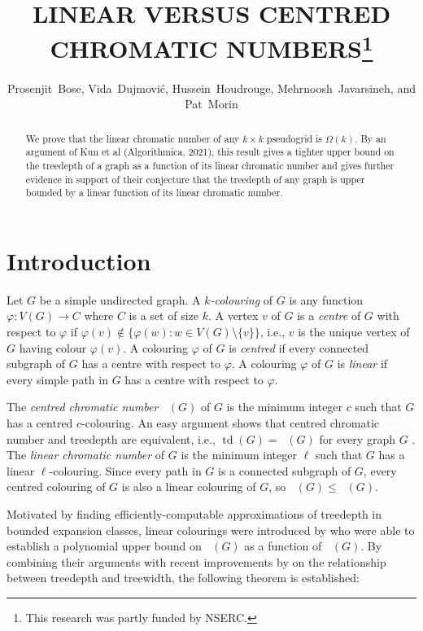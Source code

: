 \documentclass{patmorin}
\title{\MakeUppercase{Linear versus centred chromatic numbers}\thanks{This research was partly funded by NSERC.}}
\author{Prosenjit~Bose, Vida~Dujmović, Hussein~Houdrouge, Mehrnoosh~Javarsineh, and Pat~Morin}
\date{}
\newcommand{\defin}[1]{\emph{\color{brightmaroon}#1}}
\DeclareMathOperator{\td}{td}
\DeclareMathOperator{\chicen}{\chi_{\mathrm{cen}}}
\DeclareMathOperator{\chilin}{\chi_{\mathrm{lin}}}
\begin{document}
\maketitle
\renewcommand{\E}{\mathbb{E}}
\renewcommand{\Pr}{\mathbb{P}}

\begin{abstract}
  We prove that the linear chromatic number of any $k\times k$ pseudogrid is $\Omega(k)$.  By an argument of Kun et al (Algorithmica, 2021), this result gives a tighter upper bound on the treedepth of a graph as a function of its linear chromatic number and gives further evidence in support of their conjecture that the treedepth of any graph is upper bounded by a linear function of its linear chromatic number.
\end{abstract}

\section{Introduction}

Let $G$ be a simple undirected graph.  A \defin{$k$-colouring} of $G$ is any function $\varphi:V(G)\to C$ where $C$ is a set of size $k$.  A vertex $v$ of $G$ is a \defin{centre} of $G$ with respect to $\varphi$ if $\varphi(v)\not\in\{\varphi(w):w\in V(G)\setminus\{v\}\}$, i.e., $v$ is the unique vertex of $G$ having colour $\varphi(v)$.  A colouring $\varphi$ of $G$ is \defin{centred} if every connected subgraph of $G$ has a centre with respect to $\varphi$. A colouring $\varphi$ of $G$ is \defin{linear} if every simple path in $G$ has a centre with respect to $\varphi$.

The \defin{centred chromatic number} $\chicen(G)$ of $G$ is the minimum integer $c$ such that $G$ has a centred $c$-colouring.  An easy argument shows that centred chromatic number and treedepth are equivalent, i.e., $\td(G)=\chicen(G)$ for every graph $G$ \cite{nesetril.ossona:sparsity}. The \defin{linear chromatic number} of $G$ is the minimum integer $\ell$ such that $G$ has a linear $\ell$-colouring.  Since every path in $G$ is a connected subgraph of $G$, every centred colouring of $G$ is also a linear colouring of $G$, so $\chilin(G)\le\chicen(G)$.

Motivated by finding efficiently-computable approximations of treedepth in bounded expansion classes, linear colourings were introduced by \citet{kun.obrien.ea:polynomial} who were able to establish a polynomial upper bound on $\chicen(G)$ as a function of $\chilin(G)$.  By combining their arguments with recent improvements by \citet{czerwinski.nadara.ea:improved} on the relationship between treedepth and treewidth, the following theorem is established:
\end{document}
